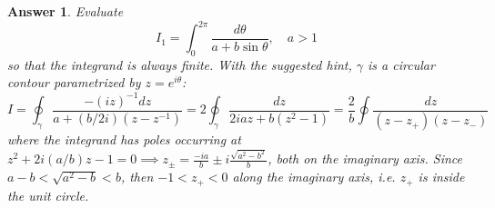 \documentclass[a4paper]{article}
\newtheorem{ans}{Answer}[section]
\theoremstyle{new}
\begin{document}
\begin{ans}
Evaluate
$$I_1=\int_0^{2\pi}\frac{d\theta}{a+b\sin\theta},\quad a>1$$
so that the integrand is always finite. With the suggested hint, $\gamma$ is a circular contour parametrized by $z=e^{i\theta}$:
$$I=\oint_{\gamma}\frac{-(iz)^{-1}dz}{a+(b/2i)(z-z^{-1})}=2\oint_\gamma\frac{dz}{2iaz+b(z^2-1)}=\frac{2}{b}\oint\frac{dz}{(z-z_+)(z-z_-)}$$
where the integrand has poles occurring at $z^2+2i(a/b)z-1=0\implies z_\pm=\frac{-ia}{b}\pm i\frac{\sqrt{a^2-b^2}}{b}$, both on the imaginary axis. Since $a-b<\sqrt{a^2-b}<b$, then $-1<z_+<0$ along the imaginary axis, i.e. $z_+$ is inside the unit circle. 
 \begin{center}
\end{center}
\end{ans}
\end{document}
